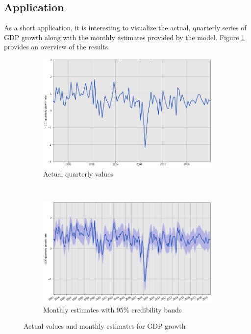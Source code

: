 \subsection{Application}
\label{chapter3_section3_subsection4}

As a short application, it is interesting to visualize the actual, quarterly series of GDP growth along with the monthly estimates provided by the model. Figure \ref{fig_c3_s3_ss4_1} provides an overview of the results.

\newpage

\begin{figure} [H]
\centering
\begin{subfigure}[t]{0.7\textwidth}
\centering
\includegraphics[width=\linewidth]{images/quarterly_gdp.png}
\caption{Actual quarterly values}
\end{subfigure} 	\hspace{1cm} \\
\begin{subfigure}[t]{0.7\textwidth}
\centering
\includegraphics[width=\linewidth]{images/monthly_gdp.png}
\caption{Monthly estimates with 95\% credibility bands}
\end{subfigure}
\caption{Actual values and monthly estimates for GDP growth}
\label{fig_c3_s3_ss4_1}
\vspace{-3mm}
\end{figure}

